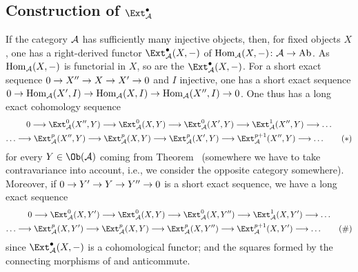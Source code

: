 \documentclass[a4paper,parskip=half,numbers=enddot, DIV=12]{scrreprt}
\begin{document}
\subsection{Construction of \texorpdfstring{$\Ext_\Aa^\bullet$}{Ext}}
If the category $\mathcal{A}$ has sufficiently many injective objects, then, for fixed objects $X$, one has a right-derived functor $\Ext_\Aa^\bullet(X,-)$ of $\Hom_\Aa(X,-)\colon \Aa\morphism\cat{Ab}$. As $\operatorname{Hom}_{\mathcal{A}}(X,-)$ is functorial in $X$, so are the $\Ext_\Aa^\bullet(X,-)$. For a short exact sequence $0\morphism X''\morphism X\morphism X'\morphism 0$ and $I$ injective, one has a short exact sequence $0\morphism\Hom_\Aa(X',I)\morphism\Hom_\Aa(X,I)\morphism\Hom_\Aa(X'',I)\morphism 0$. One thus has a long exact cohomology sequence
\begin{multline}\lbl{eq:ExtSeq1}
	0\morphism\Ext_\Aa^0(X'',Y)\morphism\Ext_\Aa^0(X,Y)\morphism\Ext_\Aa^0(X',Y)\morphism\Ext_\Aa^1(X'',Y)\morphism\ldots\\
	\ldots\morphism\Ext_\Aa^p(X'',Y)\morphism\Ext_\Aa^p(X,Y)\morphism\Ext_\Aa^p(X',Y)\morphism\Ext_\Aa^{p+1}(X'',Y)\morphism\ldots\tag{$*$}
\end{multline}
for every $Y\in\Ob(\Aa)$ coming from Theorem~ (somewhere we have to take contravariance into account, i.e., we consider the opposite category somewhere). Moreover, if $0\morphism Y'\morphism Y\morphism Y''\morphism 0$ is  a short exact sequence, we have a long exact sequence
\begin{multline}\lbl{eq:ExtSeq2}
0\morphism\Ext_\Aa^0(X,Y')\morphism\Ext_\Aa^0(X,Y)\morphism\Ext_\Aa^0(X,Y'')\morphism\Ext_\Aa^1(X,Y')\morphism\ldots\\
\ldots\morphism\Ext_\Aa^p(X,Y')\morphism\Ext_\Aa^p(X,Y)\morphism\Ext_\Aa^p(X,Y'')\morphism\Ext_\Aa^{p+1}(X,Y')\morphism\ldots\tag{\#}
\end{multline}
since $\Ext_\Aa^\bullet(X,-)$ is a cohomological functor; and the squares formed by the connecting morphisms of   and  anticommute.
\end{document}
